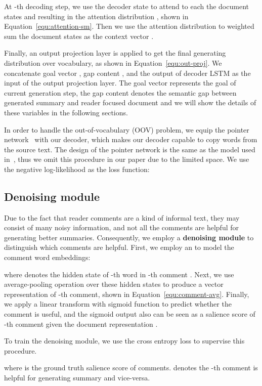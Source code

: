 \documentclass[letterpaper]{article} \usepackage{aaai19}  \usepackage{times}  \usepackage{helvet}  \usepackage{courier}
\begin{document}
At -th decoding step, we use the decoder state  to attend to each the document states  and resulting in the attention distribution , shown in Equation~\ref{equ:attention-sm}.
Then we use the attention distribution  to weighted sum the document states as the context vector .

Finally, an output projection layer is applied to get the final generating distribution  over vocabulary, as shown in Equation~\ref{equ:out-proj}.
We concatenate goal vector , gap content , and the output of decoder LSTM  as the input of the output projection layer.
The goal vector  represents the goal of current generation step, the gap content  denotes the semantic gap between generated summary and reader focused document and we will show the details of these variables in the following sections.

In order to handle the out-of-vocabulary (OOV) problem, we equip the pointer network~\cite{Gu2016IncorporatingCM,vinyals2015pointer,see2017get} with our decoder, which makes our decoder capable to copy words from the source text.
The design of the pointer network is the same as the model used in~\cite{see2017get}, thus we omit this procedure in our paper due to the limited space.
We use the negative log-likelihood as the loss function:


\subsection{Denoising module}

Due to the fact that reader comments are a kind of informal text, they may consist of many noisy information, and not all the comments are helpful for generating better summaries.
Consequently, we employ a \textbf{denoising module} to distinguish which comments are helpful.
First, we employ an  to model the comment word embeddings:

where  denotes the hidden state of -th word in -th comment .
Next, we use average-pooling operation over these hidden states to produce a vector representation  of -th comment, shown in Equation~\ref{equ:comment-avg}.
Finally, we apply a linear transform with sigmoid function to predict whether the comment is useful, and the sigmoid output  also can be seen as a salience score of -th comment given the document representation .

To train the denoising module, we use the cross entropy loss to supervise this procedure.
 
where  is the ground truth salience score of comments. 
 denotes the -th comment  is helpful for generating summary and vice-versa. 
\end{document}
